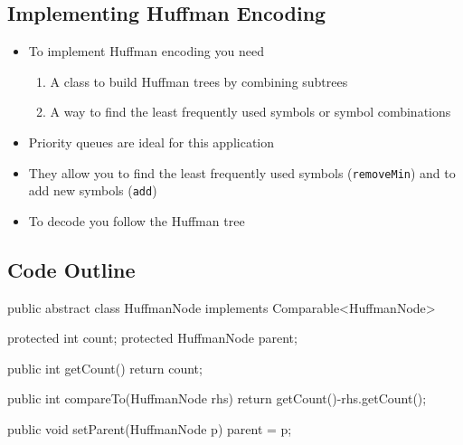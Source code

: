\begin{slide}
\section{Implementing Huffman Encoding}

\begin{PauseHighLight}
  \begin{itemize}
  \item To implement Huffman encoding you need
    \begin{enumerate}
    \item A class to build Huffman trees by combining subtrees\pause
    \item A way to find the least frequently used symbols or symbol
      combinations\pause
    \end{enumerate}
  \item Priority queues are ideal for this application\pause
  \item They allow you to find the least frequently used symbols
    (\texttt{removeMin}) and to add new symbols (\texttt{add})\pause
  \item To decode you follow the Huffman tree\pause
  \end{itemize}
\end{PauseHighLight}

\end{slide}



\begin{slide}
\section{Code Outline}

\begin{java}
public abstract class HuffmanNode implements Comparable<HuffmanNode>
{
    protected int count;
    protected HuffmanNode parent;

    public int getCount()
    {
        return count;
    }

    public int compareTo(HuffmanNode rhs)
    {
        return getCount()-rhs.getCount();
    }

    public void setParent(HuffmanNode p)
    {
        parent = p;
    }
}
\end{java}
\end{slide}


